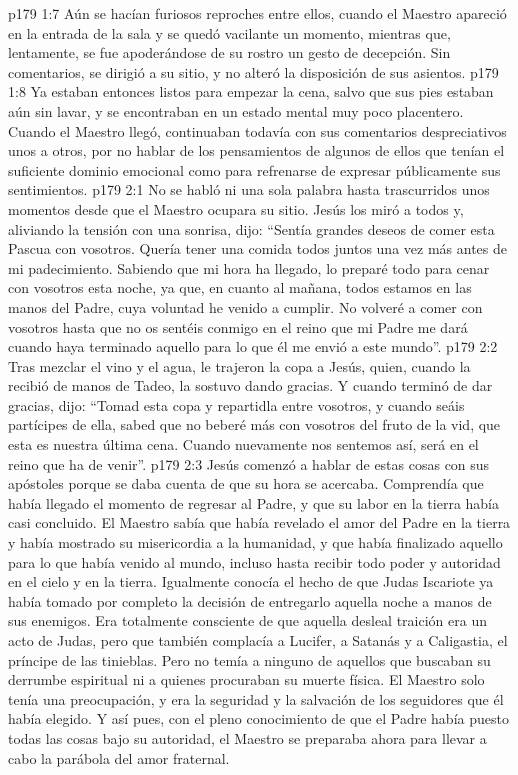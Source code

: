 \vs p179 1:7 \pc Aún se hacían furiosos reproches entre ellos, cuando el Maestro apareció en la entrada de la sala y se quedó vacilante un momento, mientras que, lentamente, se fue apoderándose de su rostro un gesto de decepción. Sin comentarios, se dirigió a su sitio, y no alteró la disposición de sus asientos.
\vs p179 1:8 Ya estaban entonces listos para empezar la cena, salvo que sus pies estaban aún sin lavar, y se encontraban en un estado mental muy poco placentero. Cuando el Maestro llegó, continuaban todavía con sus comentarios despreciativos unos a otros, por no hablar de los pensamientos de algunos de ellos que tenían el suficiente dominio emocional como para refrenarse de expresar públicamente sus sentimientos.
\vs p179 2:1 No se habló ni una sola palabra hasta trascurridos unos momentos desde que el Maestro ocupara su sitio. Jesús los miró a todos y, aliviando la tensión con una sonrisa, dijo: “Sentía grandes deseos de comer esta Pascua con vosotros. Quería tener una comida todos juntos una vez más antes de mi padecimiento. Sabiendo que mi hora ha llegado, lo preparé todo para cenar con vosotros esta noche, ya que, en cuanto al mañana, todos estamos en las manos del Padre, cuya voluntad he venido a cumplir. No volveré a comer con vosotros hasta que no os sentéis conmigo en el reino que mi Padre me dará cuando haya terminado aquello para lo que él me envió a este mundo”.
\vs p179 2:2 Tras mezclar el vino y el agua, le trajeron la copa a Jesús, quien, cuando la recibió de manos de Tadeo, la sostuvo dando gracias. Y cuando terminó de dar gracias, dijo: “Tomad esta copa y repartidla entre vosotros, y cuando seáis partícipes de ella, sabed que no beberé más con vosotros del fruto de la vid, que esta es nuestra última cena. Cuando nuevamente nos sentemos así, será en el reino que ha de venir”.
\vs p179 2:3 Jesús comenzó a hablar de estas cosas con sus apóstoles porque se daba cuenta de que su hora se acercaba. Comprendía que había llegado el momento de regresar al Padre, y que su labor en la tierra había casi concluido. El Maestro sabía que había revelado el amor del Padre en la tierra y había mostrado su misericordia a la humanidad, y que había finalizado aquello para lo que había venido al mundo, incluso hasta recibir todo poder y autoridad en el cielo y en la tierra. Igualmente conocía el hecho de que Judas Iscariote ya había tomado por completo la decisión de entregarlo aquella noche a manos de sus enemigos. Era totalmente consciente de que aquella desleal traición era un acto de Judas, pero que también complacía a Lucifer, a Satanás y a Caligastia, el príncipe de las tinieblas. Pero no temía a ninguno de aquellos que buscaban su derrumbe espiritual ni a quienes procuraban su muerte física. El Maestro solo tenía una preocupación, y era la seguridad y la salvación de los seguidores que él había elegido. Y así pues, con el pleno conocimiento de que el Padre había puesto todas las cosas bajo su autoridad, el Maestro se preparaba ahora para llevar a cabo la parábola del amor fraternal.
